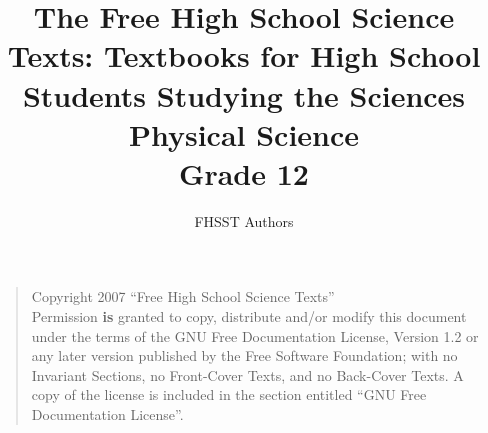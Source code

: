 \documentclass[9pt,a4paper,titlepage,twoside,openright]{extbook}
\begin{document}
\title{The Free High School Science Texts: Textbooks for High School Students Studying the Sciences\\
\textbf{Physical Science}\\
Grade 12}
\author{FHSST Authors}
\maketitle
\begin{quote}
Copyright 2007 ``Free High School Science Texts''\\
Permission \textbf{is} granted to copy, distribute and/or modify this document under the terms of the GNU Free Documentation License, Version 1.2 or any later version published by the Free Software Foundation; with no Invariant Sections, no Front-Cover Texts, and no Back-Cover Texts.
A copy of the license is included in the section entitled ``GNU Free Documentation License''.
\end{quote}
\end{document}
